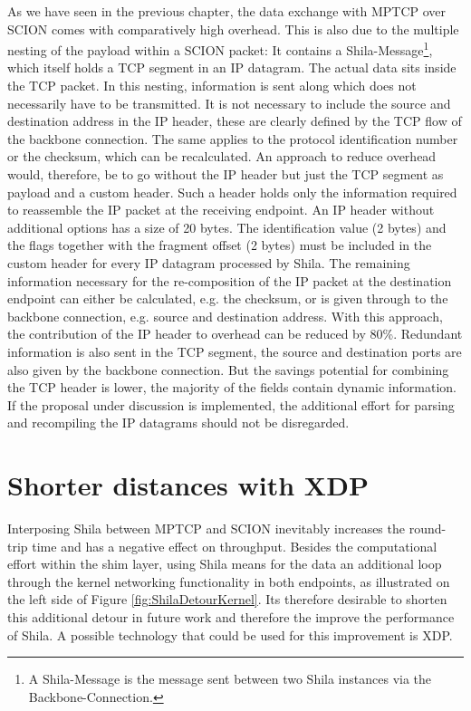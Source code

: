 As we have seen in the previous chapter, the data exchange with MPTCP over SCION comes with comparatively high overhead. This is also due to the multiple nesting of the payload within a SCION packet: It contains a Shila-Message\footnote{A Shila-Message is the message sent between two Shila instances via the Backbone-Connection.}, which itself holds a TCP segment in an IP datagram. The actual data sits inside the TCP packet. In this nesting, information is sent along which does not necessarily have to be transmitted. It is not necessary to include the source and destination address in the IP header, these are clearly defined by the TCP flow of the backbone connection. The same applies to the protocol identification number or the checksum, which can be recalculated. An approach to reduce overhead would, therefore, be to go without the IP header but just the TCP segment as payload and a custom header. Such a header holds only the information required to reassemble the IP packet at the receiving endpoint. An IP header without additional options has a size of 20 bytes. The identification value (2 bytes) and the flags together with the fragment offset (2 bytes) must be included in the custom header for every IP datagram processed by Shila. The remaining information necessary for the re-composition of the IP packet at the destination endpoint can either be calculated, e.g. the checksum, or is given through to the backbone connection, e.g. source and destination address. With this approach, the contribution of the IP header to overhead can be reduced by 80\%. Redundant information is also sent in the TCP segment, the source and destination ports are also given by the backbone connection. But the savings potential for combining the TCP header is lower, the majority of the fields contain dynamic information. If the proposal under discussion is implemented, the additional effort for parsing and recompiling the IP datagrams should not be disregarded.

\section*{Shorter distances with XDP}

Interposing Shila between MPTCP and SCION inevitably increases the round-trip time and has a negative effect on throughput. Besides the computational effort within the shim layer, using Shila means for the data an additional loop through the kernel networking functionality in both endpoints, as illustrated on the left side of Figure \ref{fig:ShilaDetourKernel}. Its therefore desirable to shorten this additional detour in future work and therefore the improve the performance of Shila. A possible technology that could be used for this improvement is XDP.

